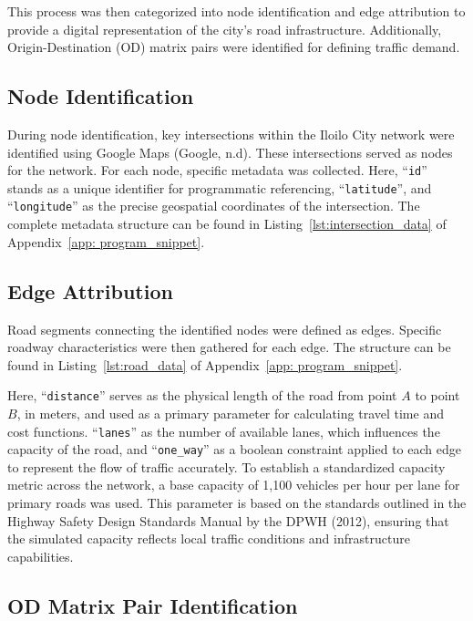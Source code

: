 This process was then categorized into node identification and edge attribution to provide a digital representation of the city's road infrastructure.  Additionally, Origin-Destination (OD) matrix pairs were identified for defining traffic demand. 

\subsection{Node Identification}
\label{sec:node_identification}

During node identification,  key intersections within the Iloilo City network were identified using Google Maps (Google, n.d). These intersections served as nodes for the network. For each node, specific metadata was collected. 
Here, ``\texttt{id}'' stands as a unique identifier for programmatic referencing, ``\texttt{latitude}'', and ``\texttt{longitude}'' as the precise geospatial coordinates of the intersection.  The complete metadata structure can be found in Listing~\ref{lst:intersection_data} of Appendix~\ref{app: program_snippet}.



\subsection{Edge Attribution}
\label{sec:edge_attribution}

Road segments connecting the identified nodes were defined as edges. Specific roadway characteristics were then gathered for each edge. The structure can be found in Listing~\ref{lst:road_data} of Appendix~\ref{app: program_snippet}.

Here, ``\texttt{distance}'' serves as the physical length of the road from point $A$ to point $B$, in meters, and used as a primary parameter for calculating travel time and cost functions. ``\texttt{lanes}'' as the number of available lanes, which influences the capacity of the road, and ``\texttt{one\_way}'' as a boolean constraint applied to each edge to represent the flow of traffic accurately. To establish a standardized capacity metric across the network, a base capacity of 1,100 vehicles per hour per lane for primary roads was used. This parameter is based on the standards outlined in the Highway Safety Design Standards Manual by the DPWH (2012), ensuring that the simulated capacity reflects local traffic conditions and infrastructure capabilities.

\subsection{OD Matrix Pair Identification}
\label{sec:pair_identification}

